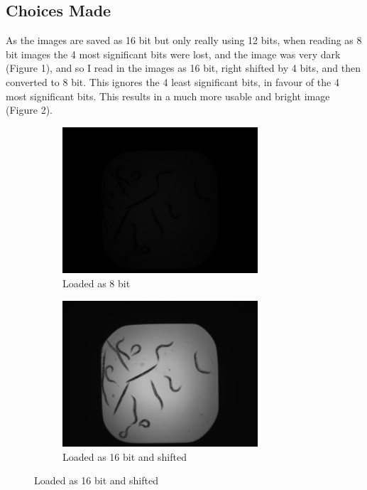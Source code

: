 \documentclass[a4paper,12pt]{article}
\begin{document}
\subsection*{Choices Made}
As the images are saved as 16 bit but only really using 12 bits, when reading as 8 bit images the 4 most significant bits were lost, and the image was very dark (Figure 1), and so I read in the images as 16 bit, right shifted by 4 bits, and then converted to 8 bit. This ignores the 4 least significant bits, in favour of the 4 most significant bits. This results in a much more usable and bright image (Figure 2).\\
\begin{figure}[ht!]
    \centering
    \begin{subfigure}{0.5\textwidth}
        \centering
        \includegraphics[width=0.8\textwidth]{A01_step0_unshifted.jpg}
        \caption{Loaded as 8 bit}
        \label{Figure 1}
    \end{subfigure}%
    \begin{subfigure}{0.5\textwidth}
        \centering
        \includegraphics[width=0.8\textwidth]{A01_step0.jpg}
        \caption{Loaded as 16 bit and shifted}
        \label{Figure 2}
    \end{subfigure}
\end{figure}
\end{document}
